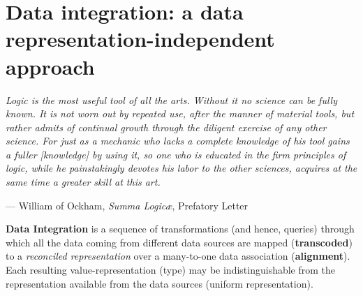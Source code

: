 \chapter{Data integration: a data representation-independent approach}\label{cha:dataintegration}

\epigraph{\textit{
		Logic is the most useful tool of all the arts. Without it no science can be fully known. It is not worn out by repeated use, after the manner of material tools, but rather admits of continual growth through the diligent exercise of any other science. For just as a mechanic who lacks a complete knowledge of his tool gains a fuller [knowledge] by using it, so one who is educated in the firm principles of logic, while he painstakingly devotes his labor to the other sciences, acquires at the same time a greater skill at this art.
	}}{--- William of Ockham, \textit{Summa Logic\ae}, Prefatory Letter}

\textbf{Data Integration} is a sequence of transformations (and hence, queries) through which all the data coming from different data sources are mapped (\textbf{transcoded}) to a \textit{reconciled representation} over a many-to-one data association (\textbf{alignment}). Each resulting value-representation (type) may be indistinguishable from the representation available from the data sources (uniform representation).

